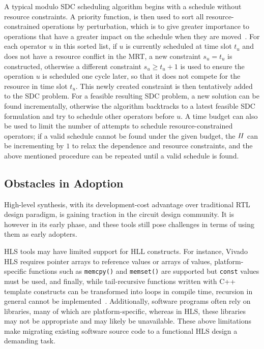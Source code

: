 A typical modulo SDC scheduling algorithm begins with a schedule without
resource constraints.  A priority function, is then used to sort all
resource-constrained operations by perturbation, which is to give greater
importance to operations that have a greater impact on the schedule when they
are moved~\cite{canis14}.  For each operator $u$ in this sorted list, if $u$ is
currently scheduled at time slot $t_u$ and does not have a resource conflict
in the MRT, a new constraint $s_u = t_u$ is constructed, otherwise a different
constraint $s_u \geq t_u + 1$ is used to ensure the operation $u$ is scheduled
one cycle later, so that it does not compete for the resource in time slot
$t_u$.  This newly created constraint is then tentatively added to the SDC
problem.  For a feasible resulting SDC problem, a new solution can be found
incrementally, otherwise the algorithm backtracks to a latest feasible SDC
formulation and try to schedule other operators before $u$.  A time budget can
also be used to limit the number of attempts to schedule resource-constrained
operators; if a valid schedule cannot be found under the given budget,
the $\mathit{II}$ can be incrementing by $1$ to relax the dependence and resource
constraints, and the above mentioned procedure can be repeated until a valid
schedule is found.


\subsection{Obstacles in Adoption}
\label{sub:obstacles_in_adoption}

High-level synthesis, with its development-cost advantage over traditional RTL
design paradigm, is gaining traction in the circuit design community.  It is
however in its early phase, and these tools still pose challenges in terms of
using them as early adopters.

HLS tools may have limited support for HLL constructs.  For instance,
Vivado HLS requires pointer arrays to reference values or arrays of values,
platform-specific functions such as \verb|memcpy()| and \verb|memset()|
are supported but \verb|const| values must be used, and finally, while
tail-recursive functions written with C++ template constructs can be
transformed into loops in compile time, recursion in general cannot be
implemented~\cite{vivado_hls}.  Additionally, software programs often rely
on libraries, many of which are platform-specific, whereas in HLS\@, these
libraries may not be appropriate and may likely be unavailable.  These above
limitations make migrating existing software source code to a functional HLS
design a demanding task.

